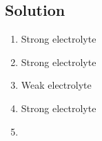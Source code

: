 \documentclass[10pt]{article}
\begin{document}
        \subsection{Solution}
            \begin{multicols}{3}
                \begin{enumerate}[label=\alph*)]
                    \item   Strong electrolyte
                    \item   Strong electrolyte
                    \item   Weak electrolyte
                    \item   Strong electrolyte
                    \item   
                \end{enumerate}
            \end{multicols}

        



\end{document}
